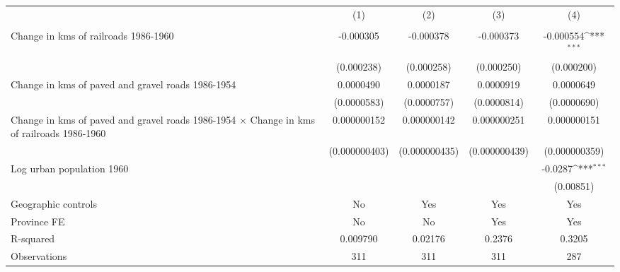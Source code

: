 {
\def\sym#1{\ifmmode^{#1}\else\(^{#1}\)\fi}
\begin{tabular}{l*{4}{c}}
\hline\hline
                &\multicolumn{1}{c}{(1)}&\multicolumn{1}{c}{(2)}&\multicolumn{1}{c}{(3)}&\multicolumn{1}{c}{(4)}\\
                &\multicolumn{1}{c}{}&\multicolumn{1}{c}{}&\multicolumn{1}{c}{}&\multicolumn{1}{c}{}\\
\hline
Change in kms of railroads 1986-1960&-0.000305         &-0.000378         &-0.000373         &-0.000554\sym{***}\\
                &(0.000238)         &(0.000258)         &(0.000250)         &(0.000200)         \\
[1em]
Change in kms of paved and gravel roads 1986-1954&0.0000490         &0.0000187         &0.0000919         &0.0000649         \\
                &(0.0000583)         &(0.0000757)         &(0.0000814)         &(0.0000690)         \\
[1em]
Change in kms of paved and gravel roads 1986-1954 $\times$ Change in kms of railroads 1986-1960&0.000000152         &0.000000142         &0.000000251         &0.000000151         \\
                &(0.000000403)         &(0.000000435)         &(0.000000439)         &(0.000000359)         \\
[1em]
Log urban population 1960&                  &                  &                  &  -0.0287\sym{***}\\
                &                  &                  &                  &(0.00851)         \\
\hline
Geographic controls&       No         &      Yes         &      Yes         &      Yes         \\
Province FE     &       No         &       No         &      Yes         &      Yes         \\
R-squared       & 0.009790         &  0.02176         &   0.2376         &   0.3205         \\
Observations    &      311         &      311         &      311         &      287         \\
\hline\hline
\end{tabular}
}
